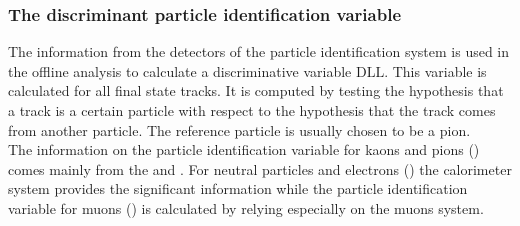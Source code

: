 \subsubsection{The discriminant particle identification variable}
\label{sec:pid}
The information from the detectors of the particle identification system is used in the offline analysis to calculate a discriminative variable $\mathrm{DLL}$. This variable is calculated for all final state tracks. It is computed by testing the hypothesis that a track is a certain particle with respect to the hypothesis that the track comes from another particle. The reference particle is usually chosen to be a pion.\\
The information on the particle identification variable for kaons and pions (\dllkpi) comes mainly from the \richone and \richtwo. For neutral particles and electrons (\dllepi) the calorimeter system provides the significant information while the particle identification variable for muons (\dllmupi) is calculated by relying especially on the muons system.\\

